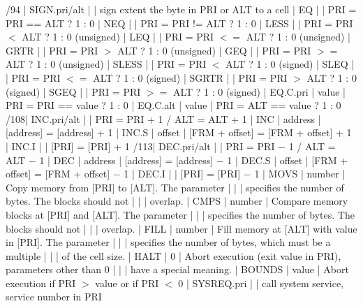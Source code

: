 {/94 | SIGN.pri/alt   |         | sign extent the byte in PRI or ALT to a cell \nl
{}    | EQ             |         | PRI = PRI == ALT ? 1 : 0 \nl
{}    | NEQ            |         | PRI = PRI != ALT ? 1 : 0 \nl
{}    | LESS           |         | PRI = PRI $<$ ALT ? 1 : 0 (unsigned) \nl
{}    | LEQ            |         | PRI = PRI $<=$ ALT ? 1 : 0 (unsigned) \nl
{}    | GRTR           |         | PRI = PRI $>$ ALT ? 1 : 0 (unsigned) \nl
{}    | GEQ            |         | PRI = PRI $>=$ ALT ? 1 : 0 (unsigned) \nl
{}    | SLESS          |         | PRI = PRI $<$ ALT ? 1 : 0 (signed) \nl
{}    | SLEQ           |         | PRI = PRI $<=$ ALT ? 1 : 0 (signed) \nl
{}    | SGRTR          |         | PRI = PRI $>$ ALT ? 1 : 0 (signed) \nl
{}    | SGEQ           |         | PRI = PRI $>=$ ALT ? 1 : 0 (signed) \nl
{}    | EQ.C.pri       | value   | PRI = PRI == value ? 1 : 0 \nl
{}    | EQ.C.alt       | value   | PRI = ALT == value ? 1 : 0 \nl
{}/108| INC.pri/alt    |         | PRI = PRI + 1 / ALT = ALT + 1 \nl
{}   | INC            | address | [address] = [address] + 1 \nl
{}   | INC.S          | offset  | [FRM + offset] = [FRM + offset] + 1 \nl
{}   | INC.I          |         | [PRI] = [PRI] + 1 \nl
{}/113| DEC.pri/alt    |         | PRI = PRI $-$ 1 / ALT = ALT $-$ 1 \nl
{}   | DEC            | address | [address] = [address] $-$ 1 \nl
{}   | DEC.S          | offset  | [FRM + offset] = [FRM + offset] $-$ 1 \nl
{}   | DEC.I          |         | [PRI] = [PRI] $-$ 1 \nl
{}   | MOVS           | number  | Copy memory from [PRI] to [ALT]. The parameter \nlnorule
\!       |                |         | specifies the number of bytes. The blocks should not \nlnorule
\!       |                |         | overlap. \nl
{}   | CMPS           | number  | Compare memory blocks at [PRI] and [ALT]. The parameter \nlnorule
\!       |                |         | specifies the number of bytes. The blocks should not \nlnorule
\!       |                |         | overlap. \nl
{}   | FILL           | number  | Fill memory at [ALT] with value in [PRI]. The parameter \nlnorule
\!       |                |         | specifies the number of bytes, which must be a multiple \nlnorule
\!       |                |         | of the cell size. \nl
{}   | HALT           | 0       | Abort execution (exit value in PRI), parameters other than 0 \nlnorule
\!       |                |         | have a special meaning. \nl
{}   | BOUNDS         | value   | Abort execution if PRI $>$ value or if PRI $<$ 0\nl
{}   | SYSREQ.pri     |         | call system service, service number in PRI \nl
}

